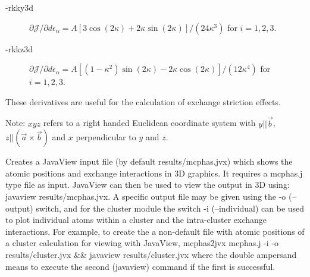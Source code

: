 \begin{description}
\begin{description}
\begin{description}
\item[-rkky3d]  $ \partial {\mathcal J}/\partial d\epsilon_{\alpha}  = A[3 \cos(2\kappa) + 2\kappa \sin(2\kappa)]/(24\kappa^3)$ for $i=1,2,3$.
\item[-rkkz3d]  $ \partial {\mathcal J}/\partial d\epsilon_{\alpha}  = A[(1-\kappa^2 )\sin(2\kappa)-2\kappa \cos(2\kappa)]/(12\kappa^4) $ for $i=1,2,3$.
\end{description}

 These derivatives are useful for the calculation of exchange striction effects. 


\end{description}

 Note: $xyz$ refers to a right handed Euclidean coordinate system with 
 $y||\vec b$, $z||(\vec a \times \vec b)$ and $x$ perpendicular to $y$ and $z$.
\item [\prg mcphas2jvx\index{mcphas2jvx} mcphas.j] 
Creates a JavaView input file (by default {\prg results/mcphas.jvx}) which shows the atomic positions 
and exchange interactions in 3D graphics. It requires a {\prg mcphas.j} type file as input. JavaView can
then be used to view the output in 3D using: {\prg javaview results/mcphas.jvx}. A specific output file 
may be given using the {\prg -o} ({\prg --output}) switch, and for the cluster module the switch {\prg -i} 
({\prg --individual}) can be used to plot individual atoms within a cluster and the intra-cluster exchange 
interactions. For example, to create the a non-default file with atomic positions of a cluster calculation 
for viewing with JavaView, {\prg mcphas2jvx mcphas.j -i -o results/cluster.jvx \&\& javaview results/cluster.jvx} 
where the double ampersand means to execute the second ({\prg javaview}) command if the first is successful.


\end{description}
